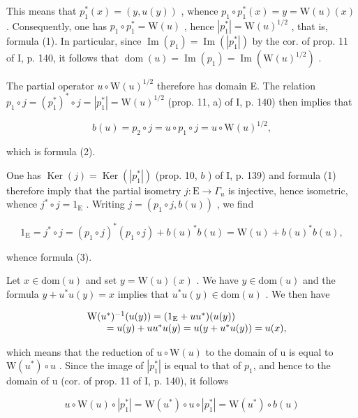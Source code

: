 This means that \(p_{1}^{*}(x) = (y, u(y))\) , whence \(p_{1} \circ p_{1}^{*}(x) = y = \mathrm{W}(u)(x)\) . Consequently, one has \(p_{1} \circ p_{1}^{*} = \mathrm{W}(u)\) , hence \(|p_{1}^{*}| = \mathrm{W}(u)^{1/2}\) , that is, formula (1). In particular, since \(\operatorname{Im}(p_{1}) = \operatorname{Im}(|p_{1}^{*}|)\) by the cor. of prop. 11 of I, p. 140, it follows that \(\operatorname{dom}(u) = \operatorname{Im}(p_{1}) = \operatorname{Im}(\mathrm{W}(u)^{1/2})\) .

The partial operator \(u \circ \mathrm{W}(u)^{1/2}\) therefore has domain E. The relation \(p_1 \circ j = (p_1^*)^* \circ j = |p_1^*| = \mathrm{W}(u)^{1/2}\) (prop. 11, a) of I, p. 140) then implies that

\[
b (u) = p _ {2} \circ j = u \circ p _ {1} \circ j = u \circ \mathrm{W} (u) ^ {1 / 2},
\]

which is formula (2).

One has \(\operatorname{Ker}(j) = \operatorname{Ker}(|p_1^*|)\) (prop. 10, \(b\) ) of I, p. 139) and formula (1) therefore imply that the partial isometry \(j: \mathrm{E} \to \Gamma_u\) is injective, hence isometric, whence \(j^* \circ j = 1_{\mathrm{E}}\) . Writing \(j = (p_1 \circ j, b(u))\) , we find

\[
1 _ {\mathrm{E}} = j ^ {*} \circ j = (p _ {1} \circ j) ^ {*} (p _ {1} \circ j) + b (u) ^ {*} b (u) = \mathrm{W} (u) + b (u) ^ {*} b (u),
\]

whence formula (3).

Let \(x \in \mathrm{dom}(u)\) and set \(y = \mathrm{W}(u)(x)\) . We have \(y \in \mathrm{dom}(u)\) and the formula \(y + u^{*}u(y) = x\) implies that \(u^{*}u(y) \in \mathrm{dom}(u)\) . We then have

\[
\begin{array}{r l} & {\mathrm{W} (u ^ {*}) ^ {- 1} (u (y)) = (1 _ {\mathrm{E}} + u u ^ {*}) (u (y))} \\ & {\qquad = u (y) + u u ^ {*} u (y) = u (y + u ^ {*} u (y)) = u (x),} \end{array}
\]

which means that the reduction of \(u \circ \mathrm{W}(u)\) to the domain of u is equal to \(\mathrm{W}(u^{*}) \circ u\) . Since the image of \(|p_{1}^{*}|\) is equal to that of \(p_{1}\), and hence to the domain of u (cor. of prop. 11 of I, p. 140), it follows

\[
u \circ \mathrm{W} (u) \circ | p _ {1} ^ {*} | = \mathrm{W} (u ^ {*}) \circ u \circ | p _ {1} ^ {*} | = \mathrm{W} (u ^ {*}) \circ b (u)
\]

